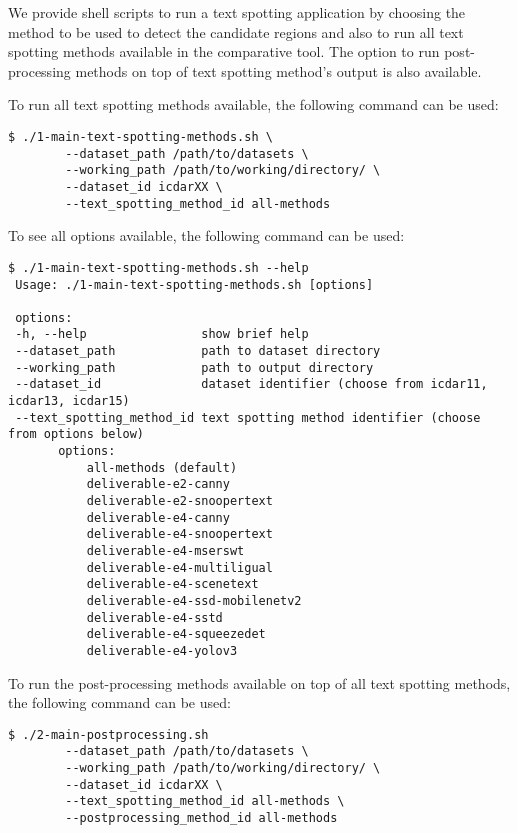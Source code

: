 \label{app:code}
We provide shell scripts to run a text spotting application by choosing the method to be used to detect the candidate regions and also to run all text spotting methods available in the comparative tool. The option to run post-processing methods on top of text spotting method's output is also available.  

To run all text spotting methods available, the following command can be used:

\begin{lstlisting}[style=fancyterminal]
 $ ./1-main-text-spotting-methods.sh \
        --dataset_path /path/to/datasets \
        --working_path /path/to/working/directory/ \
        --dataset_id icdarXX \
        --text_spotting_method_id all-methods
\end{lstlisting}

To see all options available, the following command can be used:
\begin{lstlisting}[style=fancyterminal]
 $ ./1-main-text-spotting-methods.sh --help
 Usage: ./1-main-text-spotting-methods.sh [options]
 
 options:
 -h, --help                show brief help
 --dataset_path            path to dataset directory
 --working_path            path to output directory
 --dataset_id              dataset identifier (choose from icdar11, icdar13, icdar15)
 --text_spotting_method_id text spotting method identifier (choose from options below)
       options:
           all-methods (default)
           deliverable-e2-canny
           deliverable-e2-snoopertext
           deliverable-e4-canny
           deliverable-e4-snoopertext
           deliverable-e4-mserswt
           deliverable-e4-multiligual
           deliverable-e4-scenetext
           deliverable-e4-ssd-mobilenetv2
           deliverable-e4-sstd
           deliverable-e4-squeezedet
           deliverable-e4-yolov3
\end{lstlisting}

To run the post-processing methods available on top of all text spotting methods, the following command can be used:

\begin{lstlisting}[style=fancyterminal]
 $ ./2-main-postprocessing.sh  
        --dataset_path /path/to/datasets \
        --working_path /path/to/working/directory/ \
        --dataset_id icdarXX \
        --text_spotting_method_id all-methods \
        --postprocessing_method_id all-methods
\end{lstlisting}

